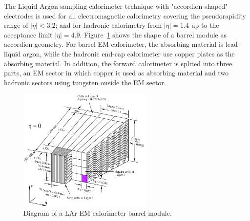 The Liquid Argon sampling calorimeter technique with "accordion-shaped" electrodes is used for all electromagnetic calorimetry covering the pseudorapidity range of $|\eta|<3.2$;
and for hadronic calorimetry from $|\eta| = 1.4$ up to the acceptance limit $|\eta| = 4.9$\cite{CERN-LHCC-96-041}.
Figure~\ref{fig:calo_lar} shows the shape of a barrel module as accordion geometry.
For barrel EM calorimeter, the absorbing material is lead-liquid argon, while the hadronic end-cap calorimeter use copper plates as the absorbing material.
In addition, the forward calorimeter is splited into three parts, an EM sector in which copper is used as absorbing material and two hadronic sectors using tungsten ouside the EM sector.
\begin{figure}[!htb]
  \centering
  \includegraphics[width=0.6\textwidth]{figures/Detector/calo_lar.png}
  \caption{Diagram of a LAr EM calorimeter barrel module\cite{Sanchez:2010}.}
  \label{fig:calo_lar}
\end{figure}

